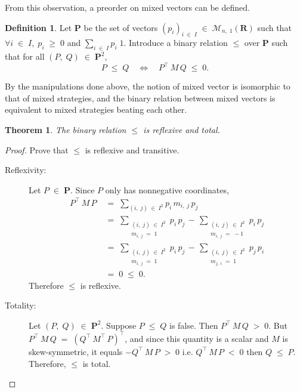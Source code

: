 \documentclass{report}
\theoremstyle{definition}
\newtheorem{defn}{Definition}
\theoremstyle{plain}
\newtheorem{thm}{Theorem}
\begin{document}
From this observation, a preorder on mixed vectors can be defined.
\begin{defn}
	\label{defn:mixed_vector}
	Let $\mathbf P$ be the set of vectors $\left(p_i\right)_{i\;\in\;I}
	\;\in\;\mathscr M_{n,\;1}\left(\mathbf R\right)$ such that
	$\forall i\;\in\;I,\;p_i\;\geqslant\;0$ and $\sum_{i\;\in\;I}p_i\;1$.
	Introduce a binary relation $\leqslant$ over $\mathbf P$ such that for
	all $\left(P,\;Q\right)\;\in\;\mathbf P^2$,
	\[P\;\leqslant\;Q\quad\Leftrightarrow\quad P^\top\,M\,Q\;\leqslant\;0.\]
\end{defn}

By the manipulations done above, the notion of mixed vector is isomorphic to
that of mixed strategies, and the binary relation between mixed vectors is
equivalent to mixed strategies beating each other.

\begin{thm}
	The binary relation $\leqslant$ is reflexive and total.
\end{thm}
\begin{proof}
	Prove that $\leqslant$ is reflexive and transitive.
	\begin{description}
	\item[Reflexivity:] Let $P\;\in\;\mathbf P$. Since $P$ only has
		nonnegative coordinates,
		\begin{align*}
		P^\top\,M\,P
		\;&=\;\sum_{\left(i,\;j\right)\;\in\;I^2}p_i\,m_{i,\;j}\,p_j \\
		&=\;\sum_{\substack{\left(i,\;j\right)\;\in\;I^2 \\
		                    m_{i,\;j}\;=\;1}}
			p_i\,p_j
		\,-\,\sum_{\substack{\left(i,\;j\right)\;\in\;I^2 \\
		                     m_{i,\;j}\;=\;-1}}
			p_i\,p_j \\
		&=\;\sum_{\substack{\left(i,\;j\right)\;\in\;I^2 \\
		                    m_{i,\;j}\;=\;1}}
			p_i\,p_j
		\,-\,\sum_{\substack{\left(i,\;j\right)\;\in\;I^2 \\
		                     m_{j,\;i}\;=\;1}}
			p_j\,p_i \\
		&=\;0\;\leqslant\;0.
		\end{align*}
		Therefore $\leqslant$ is reflexive.
	\item[Totality:] Let $\left(P,\;Q\right)\;\in\;\mathbf P^2$. Suppose
		$P\;\leqslant\;Q$ is false. Then $P^\top\,M\,Q\;>\;0$. But
		$P^\top\,M\,Q\;=\;\left(Q^\top\,M^\top\,P\right)^\top$, and
		since this quantity is a scalar and $M$ is skew-symmetric, it
		equals $-Q^\top\,M\,P\;>\;0$ i.e. $Q^\top\,M\,P\;<\;0$ then
		$Q\;\leqslant\;P$. Therefore, $\leqslant$ is total.
	\end{description}
\end{proof}
\end{document}
